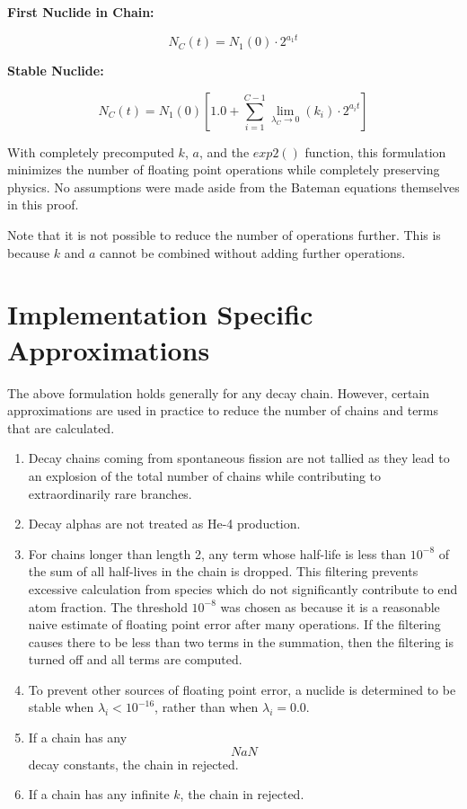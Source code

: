 \documentclass{anstrans}
\begin{document}
\textbf{First Nuclide in Chain:}

\begin{equation}
\label{nc_jawakka}
N_C(t) = N_1(0) \cdot 2^{a_1 t}
\end{equation}

\textbf{Stable Nuclide:}

\begin{equation}
\label{nc_brown_shoes}
N_C(t) = N_1(0) \left[1.0 + \sum_{i=1}^{C-1} \lim_{\lambda_C\to 0}(k_{i}) \cdot 2^{a_i t} \right]
\end{equation}

With completely precomputed $k$, $a$, and the $exp2()$ function, this 
formulation minimizes the number of floating point operations while completely 
preserving physics. No assumptions were made aside from the Bateman equations 
themselves in this proof.

Note that it is not possible to reduce the number of operations further.  This 
is because  $k$ and $a$ cannot be combined without adding further 
operations.

\section{Implementation Specific Approximations}
\label{approx}
The above formulation holds generally for any decay chain.  However, certain 
approximations are used in practice to reduce the number of chains and terms 
that are calculated.

\begin{enumerate}
\item Decay chains coming from spontaneous fission are not tallied as they 
    lead to an explosion of the total number of chains while contributing to 
    extraordinarily rare branches.
\item Decay alphas are not treated as He-4 production.
\item For chains longer than length 2, any 
    term whose half-life is less than $10^{-8}$ of the sum of all 
    half-lives in the chain is dropped. This filtering prevents excessive
    calculation from species which do not significantly contribute to 
    end atom fraction. The threshold $10^{-8}$ was chosen as 
    because it is a reasonable naive estimate of floating point error after 
    many operations. If the filtering causes there to be less than 
    two terms in the summation, then the filtering is turned off and all
    terms are computed.
\item To prevent other sources of floating point error, a nuclide is determined 
    to be stable when $\lambda_i < 10^{-16}$, rather than when 
    $\lambda_i = 0.0$.
\item If a chain has any $$NaN$$ decay constants, the chain in rejected.
\item If a chain has any infinite $k$, the chain in rejected.
\end{enumerate}
\end{document}
